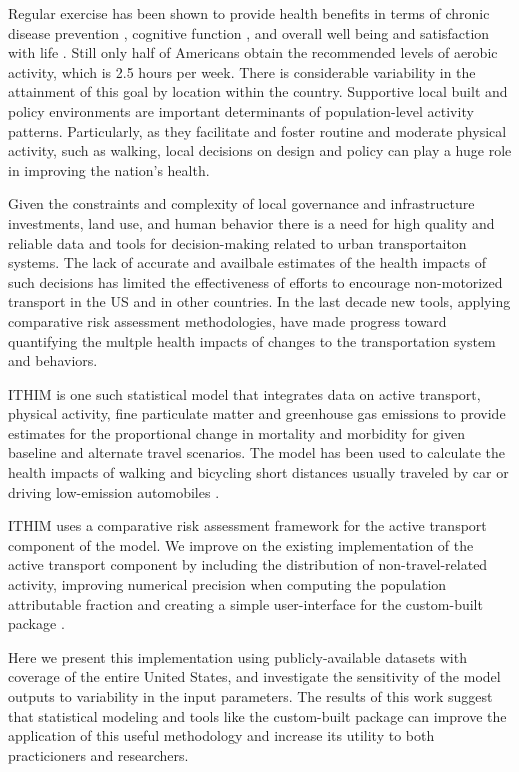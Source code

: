 Regular exercise has been shown to provide health benefits in terms of
chronic disease prevention \cite{warburton2006}, cognitive function
\cite{hillman2008}, and overall well being and satisfaction with life
\cite{maher2013}. Still only half of Americans obtain the recommended
levels of aerobic activity, which is 2.5 hours per week. There is
considerable variability in the attainment of this goal by location
within the country. Supportive local built and policy environments are
important determinants of population-level activity
patterns. Particularly, as they facilitate and foster routine and
moderate physical activity, such as walking, local decisions on design
and policy can play a huge role in improving the nation's health.

Given the constraints and complexity of local governance and
infrastructure investments, land use, and human behavior there is a
need for high quality and reliable data and tools for decision-making
related to urban transportaiton systems. The lack of accurate and
availbale estimates of the health impacts of such decisions has
limited the effectiveness of efforts to encourage non-motorized
transport in the US and in other countries. In the last decade new
tools, applying comparative risk assessment methodologies, have made
progress toward quantifying the multple health impacts of changes to
the transportation system and behaviors.

ITHIM is one such statistical model that integrates data on active
transport, physical activity, fine particulate matter and greenhouse
gas emissions to provide estimates for the proportional change in
mortality and morbidity for given baseline and alternate travel
scenarios. The model has been used to calculate the health impacts of
walking and bicycling short distances usually traveled by car or
driving low-emission automobiles \cite{woodcock2013,maizlish2013}.

ITHIM uses a comparative risk assessment framework for the active
transport component of the model.  We improve on the existing
implementation of the active transport component by including the
distribution of non-travel-related activity, improving numerical
precision when computing the population attributable fraction and
creating a simple user-interface for the custom-built \R{} package
\package{}.

Here we present this implementation using publicly-available
datasets with coverage of the entire United States, and investigate
the sensitivity of the model outputs to variability in the input
parameters. The results of this work suggest that statistical modeling
and tools like the custom-built \R{} package \package{} can improve
the application of this useful methodology and increase its utility to
both practicioners and researchers.
